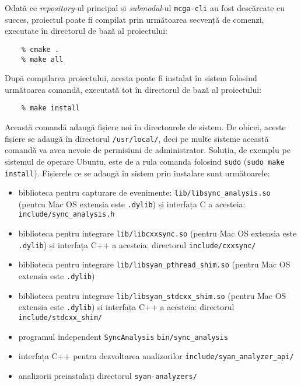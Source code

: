 Odată ce \textit{repository}-ul principal și \textit{submodul}-ul
\lstinline{mcga-cli} au fost descărcate cu succes, proiectul poate fi
compilat prin următoarea secvență de comenzi, executate în directorul de
bază al proiectului:

\begin{minipage}{\linewidth}
\begin{lstlisting}
    % cmake .
    % make all
\end{lstlisting}
\end{minipage}

După compilarea proiectului, acesta poate fi instalat în sistem folosind
următoarea comandă, executată tot în directorul de bază al proiectului:

\begin{minipage}{\linewidth}
\begin{lstlisting}
    % make install
\end{lstlisting}
\end{minipage}

Această comandă adaugă fișiere noi în directoarele de sistem. De obicei,
aceste fișiere se adaugă în directorul \lstinline{/usr/local/}, deci pe
multe sisteme această comandă va avea nevoie de permisiuni de
administrator. Soluția, de exemplu pe sistemul de operare Ubuntu, este
de a rula comanda folosind \lstinline{sudo}
(\lstinline{sudo make install}). Fișierele ce se adaugă în sistem prin
instalare sunt următoarele:

\begin{itemize}
    \item biblioteca pentru capturare de evenimente:
    \lstinline{lib/libsync_analysis.so} (pentru Mac OS extensia este
    \lstinline{.dylib}) și interfața C a acesteia:
    \lstinline{include/sync_analysis.h}
    \item biblioteca pentru integrare \lstinline{lib/libcxxsync.so}
    (pentru Mac OS extensia este \lstinline{.dylib}) și interfața C++ a
    acesteia: directorul \lstinline{include/cxxsync/}
    \item biblioteca pentru integrare
    \lstinline{lib/libsyan_pthread_shim.so} (pentru Mac OS extensia este
    \lstinline{.dylib})
    \item biblioteca pentru integrare
    \lstinline{lib/libsyan_stdcxx_shim.so} (pentru Mac OS extensia
    este \lstinline{.dylib}) și interfața C++ a acesteia: directorul
    \lstinline{include/stdcxx_shim/}
    \item programul independent \lstinline{SyncAnalysis}
    \lstinline{bin/sync_analysis}
    \item interfața C++ pentru dezvoltarea analizorilor
    \lstinline{include/syan_analyzer_api/}
    \item analizorii preinstalați directorul \lstinline{syan-analyzers/}
\end{itemize}
